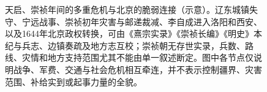 \begin{figure}[htbp]
  \caption{天启、崇祯年间的多重危机与北京的脆弱连接（示意）。辽东城镇失守、宁远战事、崇祯初年灾害与邮递裁减、李自成进入洛阳和西安、以及1644年北京政权转换，可由《熹宗实录》《崇祯长编》《明史》本纪与兵志、边镇奏疏及地方志互校；崇祯朝无存世实录，兵数、路线、灾情和地方支持范围尤其不能由单一叙述断定。图中各节点仅说明战争、军费、交通与社会危机相互牵连，并不表示控制疆界、灾害范围、补给实到或起事力量的全貌。}
  \label{fig:vol05:late-ming-crisis-multiple-fronts}
\end{figure}
